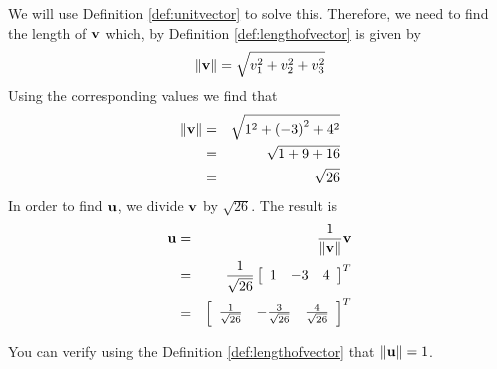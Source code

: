 \begin{solution}
We will use Definition \ref{def:unitvector} to solve this. 
Therefore, we need to find the length of $\mathbf{v}$ which, by Definition \ref{def:lengthofvector}
is given by 
\begin{equation*}
\|
\mathbf{v}
\|
= \sqrt{ v_{1}^2 + v_{2}^2+ v_{3}^2}
\end{equation*}
Using the corresponding  values we find that
\begin{eqnarray*}
\|
\mathbf{v}
\|
&=& \sqrt{ 1^2 + \left(-3 \right)^2 + 4^2} \\
&=& \sqrt{ 1 + 9 + 16} \\
&=& \sqrt{26} 
\end{eqnarray*}
In order to find $\mathbf{u}$, we divide $\mathbf{v}$ by $\sqrt{26}$.
The result is 
\begin{eqnarray*}
\mathbf{u}
&=&
\frac{1}{\| \mathbf{v} \|}
\mathbf{v} \\
&=&
\frac{1}{\sqrt{26}}
\left[
\begin{array}{rrr}
1 & -3 & 4
\end{array}
\right]^T \\
&=&
\left[
\begin{array}{rrr}
\frac{1}{\sqrt{26}} & -\frac{3}{\sqrt{26}} & \frac{4}{\sqrt{26}}
\end{array}
\right]^T
\end{eqnarray*}

You can verify using the Definition \ref{def:lengthofvector} that $\| \mathbf{u} \| = 1 $. 
\end{solution}